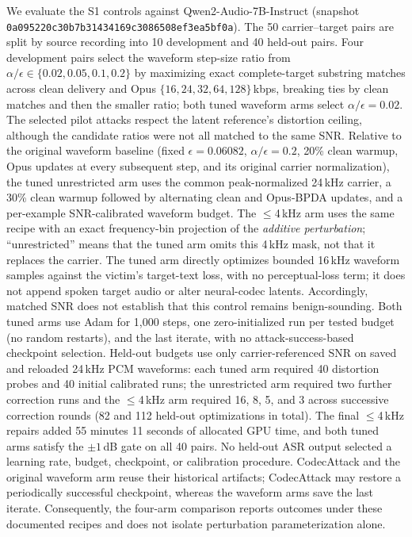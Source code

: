 We evaluate the S1 controls against Qwen2-Audio-7B-Instruct
(snapshot \texttt{0a095220c30b7b31434169c3086508ef3ea5bf0a}).
The 50 carrier--target pairs are split by source recording into 10 development
and 40 held-out pairs. Four development pairs select the waveform step-size
ratio from $\alpha/\epsilon\in\{0.02,0.05,0.1,0.2\}$ by maximizing exact
complete-target substring matches across clean delivery and Opus
$\{16,24,32,64,128\}$\,kbps, breaking ties by clean matches and then the
smaller ratio; both tuned waveform arms select $\alpha/\epsilon=0.02$.
The selected pilot attacks respect the latent reference's distortion ceiling,
although the candidate ratios were not all matched to the same SNR.
Relative to the original waveform baseline (fixed $\epsilon=0.06082$,
$\alpha/\epsilon=0.2$, 20\% clean warmup, Opus updates at every subsequent
step, and its original carrier normalization), the tuned unrestricted arm
uses the common peak-normalized 24\,kHz carrier, a 30\% clean warmup followed
by alternating clean and Opus-BPDA updates, and a per-example SNR-calibrated
waveform budget. The $\leq$4\,kHz arm uses the same recipe with an exact
frequency-bin projection of the \emph{additive perturbation}; ``unrestricted''
means that the tuned arm omits this 4\,kHz mask, not that it replaces the
carrier. The tuned arm directly optimizes bounded 16\,kHz waveform samples
against the victim's target-text loss, with no perceptual-loss term; it
does not append spoken target audio or alter neural-codec latents.
Accordingly, matched SNR does not establish that this control remains
benign-sounding. Both tuned arms use Adam for 1,000 steps, one zero-initialized run
per tested budget (no random restarts), and the last iterate, with no
attack-success-based checkpoint selection.
Held-out budgets use only carrier-referenced SNR on saved and reloaded
24\,kHz PCM waveforms: each tuned arm required 40 distortion probes and 40
initial calibrated runs; the unrestricted arm required two further
correction runs and the $\leq$4\,kHz arm required 16, 8, 5, and 3 across
successive correction rounds (82 and 112 held-out optimizations in total).
The final $\leq$4\,kHz repairs added 55 minutes 11 seconds of allocated GPU
time, and both tuned arms satisfy the $\pm1$\,dB gate on all 40 pairs.
No held-out ASR output selected a learning rate, budget, checkpoint, or
calibration procedure. CodecAttack and the original waveform arm reuse their
historical artifacts; CodecAttack may restore a periodically successful
checkpoint, whereas the waveform arms save the last iterate. Consequently,
the four-arm comparison reports outcomes under these documented recipes and
does not isolate perturbation parameterization alone.
